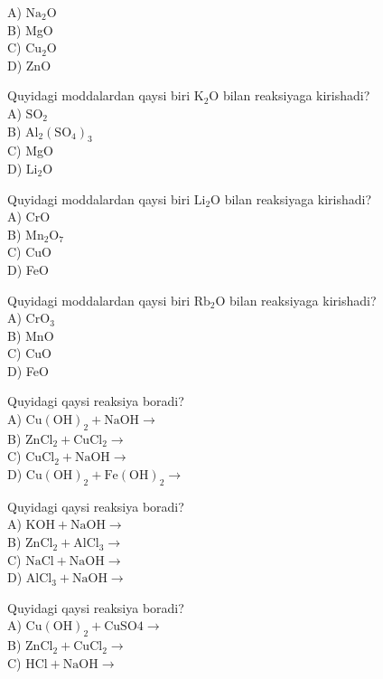 A) $\mathrm{Na}_{2} \mathrm{O}$\\
B) MgO\\
C) $\mathrm{Cu}_{2} \mathrm{O}$\\
D) ZnO
  \item Quyidagi moddalardan qaysi biri $\mathrm{K}_{2} \mathrm{O}$ bilan reaksiyaga kirishadi?\\
A) $\mathrm{SO}_{2}$\\
B) $\mathrm{Al}_{2}\left(\mathrm{SO}_{4}\right)_{3}$\\
C) MgO\\
D) $\mathrm{Li}_{2} \mathrm{O}$
  \item Quyidagi moddalardan qaysi biri $\mathrm{Li}_{2} \mathrm{O}$ bilan reaksiyaga kirishadi?\\
A) CrO\\
B) $\mathrm{Mn}_{2} \mathrm{O}_{7}$\\
C) CuO\\
D) FeO
  \item Quyidagi moddalardan qaysi biri $\mathrm{Rb}_{2} \mathrm{O}$ bilan reaksiyaga kirishadi?\\
A) $\mathrm{CrO}_{3}$\\
B) MnO\\
C) CuO\\
D) FeO
  \item Quyidagi qaysi reaksiya boradi?\\
A) $\mathrm{Cu}(\mathrm{OH})_{2}+\mathrm{NaOH} \rightarrow$\\
B) $\mathrm{ZnCl}_{2}+\mathrm{CuCl}_{2} \rightarrow$\\
C) $\mathrm{CuCl}_{2}+\mathrm{NaOH} \rightarrow$\\
D) $\mathrm{Cu}(\mathrm{OH})_{2}+\mathrm{Fe}(\mathrm{OH})_{2} \rightarrow$
  \item Quyidagi qaysi reaksiya boradi?\\
A) $\mathrm{KOH}+\mathrm{NaOH} \rightarrow$\\
B) $\mathrm{ZnCl}_{2}+\mathrm{AlCl}_{3} \rightarrow$\\
C) $\mathrm{NaCl}+\mathrm{NaOH} \rightarrow$\\
D) $\mathrm{AlCl}_{3}+\mathrm{NaOH} \rightarrow$
  \item Quyidagi qaysi reaksiya boradi?\\
A) $\mathrm{Cu}(\mathrm{OH})_{2}+\mathrm{CuSO} 4 \rightarrow$\\
B) $\mathrm{ZnCl}_{2}+\mathrm{CuCl}_{2} \rightarrow$\\
C) $\mathrm{HCl}+\mathrm{NaOH} \rightarrow$\\

